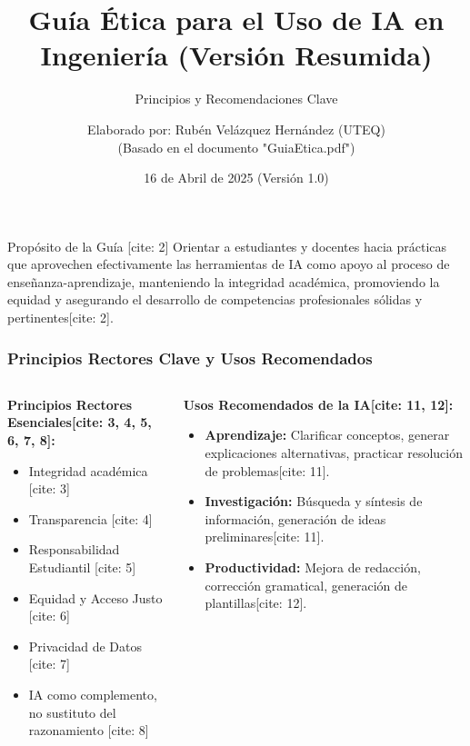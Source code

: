 \documentclass{beamer}
\title[Guía Ética IA Resumida]{Guía Ética para el Uso de IA en Ingeniería (Versión Resumida)}
\subtitle{Principios y Recomendaciones Clave}
\author{Elaborado por: Rubén Velázquez Hernández (UTEQ) \\ (Basado en el documento "GuiaEtica.pdf")}
\institute[UTEQ]{Universidad Tecnológica de Querétaro}
\date{16 de Abril de 2025 (Versión 1.0)}
\begin{document}
	
	\begin{frame}
		\titlepage
		\begin{block}{Propósito de la Guía [cite: 2]}
			Orientar a estudiantes y docentes hacia prácticas que aprovechen efectivamente las herramientas de IA como apoyo al proceso de enseñanza-aprendizaje, manteniendo la integridad académica, promoviendo la equidad y asegurando el desarrollo de competencias profesionales sólidas y pertinentes[cite: 2].
		\end{block}
	\end{frame}
	
	\begin{frame}
		\frametitle{Principios Rectores Clave y Usos Recomendados}
		\begin{columns}[T] %
			\begin{column}{0.5\textwidth}
				\textbf{Principios Rectores Esenciales[cite: 3, 4, 5, 6, 7, 8]:}
				\begin{itemize}
					\item Integridad académica [cite: 3]
					\item Transparencia [cite: 4]
					\item Responsabilidad Estudiantil [cite: 5]
					\item Equidad y Acceso Justo [cite: 6]
					\item Privacidad de Datos [cite: 7]
					\item IA como complemento, no sustituto del razonamiento [cite: 8]
				\end{itemize}
			\end{column}
			\begin{column}{0.5\textwidth}
				\textbf{Usos Recomendados de la IA[cite: 11, 12]:}
				\begin{itemize}
					\item \textbf{Aprendizaje:} Clarificar conceptos, generar explicaciones alternativas, practicar resolución de problemas[cite: 11].
					\item \textbf{Investigación:} Búsqueda y síntesis de información, generación de ideas preliminares[cite: 11].
					\item \textbf{Productividad:} Mejora de redacción, corrección gramatical, generación de plantillas[cite: 12].
				\end{itemize}
			\end{column}
		\end{columns}
	\end{frame}
	
\end{document}
